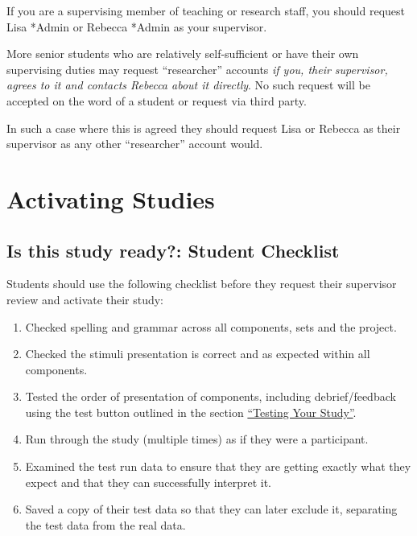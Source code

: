 \documentclass[]{book}
\providecommand{\tightlist}{%
  \setlength{\itemsep}{0pt}\setlength{\parskip}{0pt}}
\begin{document}
\begin{info}
If you are a supervising member of teaching or research staff, you
should request Lisa *Admin or Rebecca *Admin as your supervisor.

More senior students who are relatively self-sufficient or have their
own supervising duties may request ``researcher'' accounts \emph{if you,
their supervisor, agrees to it and contacts Rebecca about it directly}.
No such request will be accepted on the word of a student or request via
third party.

In such a case where this is agreed they should request Lisa or Rebecca
as their supervisor as any other ``researcher'' account would.
\end{info}

\hypertarget{activating}{\section*{Activating
Studies}\label{activating}}

\subsection{Is this study ready?: Student
Checklist}\label{is-this-study-ready-student-checklist}

Students should use the following checklist before they request their
supervisor review and activate their study:

\begin{enumerate}
\def\labelenumi{\arabic{enumi}.}
\tightlist
\item
  Checked spelling and grammar across all components, sets and the
  project.
\item
  Checked the stimuli presentation is correct and as expected within all
  components.
\item
  Tested the order of presentation of components, including
  debrief/feedback using the test button outlined in the section
  \protect\hyperlink{testingyourstudy}{``Testing Your Study''}.
\item
  Run through the study (multiple times) as if they were a participant.
\item
  Examined the test run data to ensure that they are getting exactly
  what they expect and that they can successfully interpret it.
\item
  Saved a copy of their test data so that they can later exclude it,
  separating the test data from the real data.
\end{enumerate}
\end{document}
